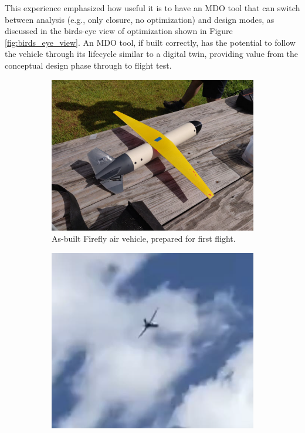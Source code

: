 This experience emphasized how useful it is to have an MDO tool that can switch between analysis (e.g., only closure, no optimization) and design modes, as discussed in the birds-eye view of optimization shown in Figure \ref{fig:birds_eye_view}. An MDO tool, if built correctly, has the potential to follow the vehicle through its lifecycle similar to a digital twin, providing value from the conceptual design phase through to flight test.

\begin{figure}[H]
    \centering
    \begin{subfigure}[b]{0.5\textwidth}
        \centering
        \includegraphics[width=\textwidth]{../figures/firefly_flight_1.png}
        \caption{As-built Firefly air vehicle, prepared for first flight.}
    \end{subfigure}
    \hfill
    \begin{subfigure}[b]{0.432\textwidth}
        \centering
        \includegraphics[width=\textwidth]{../figures/firefly_flight_2.png}

\end{subfigure}
\end{figure}
